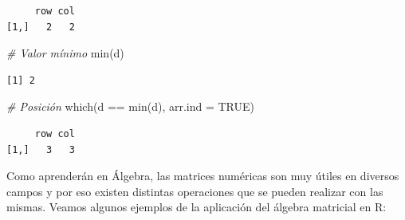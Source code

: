 \documentclass[
]{book}
\newenvironment{Shaded}{\begin{snugshade}}{\end{snugshade}}
\newcommand{\AttributeTok}[1]{\textcolor[rgb]{0.77,0.63,0.00}{#1}}
\newcommand{\CommentTok}[1]{\textcolor[rgb]{0.56,0.35,0.01}{\textit{#1}}}
\newcommand{\ConstantTok}[1]{\textcolor[rgb]{0.00,0.00,0.00}{#1}}
\newcommand{\FunctionTok}[1]{\textcolor[rgb]{0.00,0.00,0.00}{#1}}
\newcommand{\NormalTok}[1]{#1}
\newcommand{\SpecialCharTok}[1]{\textcolor[rgb]{0.00,0.00,0.00}{#1}}
\begin{document}
\begin{itemize}
\begin{verbatim}
     row col
[1,]   2   2
\end{verbatim}

\begin{Shaded}
\begin{Highlighting}[]
\CommentTok{\# Valor mínimo}
\FunctionTok{min}\NormalTok{(d)}
\end{Highlighting}
\end{Shaded}

\begin{verbatim}
[1] 2
\end{verbatim}

\begin{Shaded}
\begin{Highlighting}[]
\CommentTok{\# Posición}
\FunctionTok{which}\NormalTok{(d }\SpecialCharTok{==} \FunctionTok{min}\NormalTok{(d), }\AttributeTok{arr.ind =} \ConstantTok{TRUE}\NormalTok{)}
\end{Highlighting}
\end{Shaded}

\begin{verbatim}
     row col
[1,]   3   3
\end{verbatim}
\end{itemize}

Como aprenderán en Álgebra, las matrices numéricas son muy útiles en diversos campos y por eso existen distintas operaciones que se pueden realizar con las mismas. Veamos algunos ejemplos de la aplicación del álgebra matricial en R:
\end{document}
